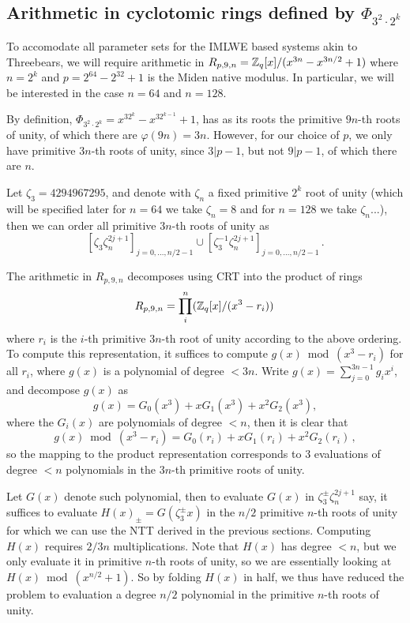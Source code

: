 \subsection{Arithmetic in cyclotomic rings defined by $\Phi_{3^2 \cdot 2^k}$}

To accomodate all parameter sets for the IMLWE based systems akin to Threebears, we will require arithmetic 
in $R_{p, 9, n} = \mathbb{Z}_q[x] / (x^{3n} - x^{3n/2} + 1)$ where $n = 2^k$ and $p = 2^64 - 2^32 + 1$ is the Miden native modulus.  
In particular, we will be interested  in the case $n = 64$ and $n = 128$.

By definition, $\Phi_{3^2 \cdot 2^k} = x^{3 2^k}  - x^{3 2^{k-1}} + 1$, has as its roots the primitive $9 n$-th roots of unity, 
of which there are $\varphi(9 n) = 3 n$.  However, for our choice of $p$, we only have primitive $3 n$-th roots of unity, since $3 | p-1$, 
but not $9 | p-1$, of which there are $n$.

Let $\zeta_3 = 4294967295$, and denote with $\zeta_{n}$ a fixed primitive $2^k$ root of unity (which will be specified later
for $n = 64$ we take $\zeta_n = 8$ and for $n = 128$ we take $\zeta_n ...$), then we can order all primitive $3 n$-th roots of unity as 
\[   [\zeta_3 \zeta_{n}^{2j+1}]_{j = 0, \ldots, n/2-1} \cup [ \zeta_3^{-1} \zeta_{n}^{2j+1}]_{j = 0, \ldots, n/2-1}  \, . \]

The arithmetic in $R_{p, 9, n}$ decomposes using CRT into the product of rings
\[  R_{p, 9, n} = \prod_{i}^{n} (\mathbb{Z}_q[x] / (x^3 - r_i))  \,  \]
where $r_i$ is the $i$-th primitive $3 n$-th root of unity according to the above ordering.
To compute this representation, it suffices to compute $g(x) \bmod (x^3 - r_i)$ for all $r_i$, 
where $g(x)$ is a polynomial of degree $< 3n$.  Write $g(x) = \sum_{j = 0}^{3n-1} g_i x^i$, 
and decompose $g(x)$ as 
\[  g(x) = G_0(x^3) + x G_1(x^3) + x^2 G_2(x^3) , \]
where the $G_i(x)$ are polynomials of degree $<n$, 
then it is clear that 
\[ g(x) \bmod (x^3 - r_i) = G_0(r_i) + x G_1(r_i) + x^2 G_2(r_i) \, ,  \]
so the mapping to the product representation corresponds to $3$ 
evaluations of degree $<n$ polynomials in the $3n$-th primitive roots of unity.

Let $G(x)$ denote such polynomial, then to evaluate $G(x)$ in $\zeta_3^{\pm} \zeta_n^{2j+1}$ say, 
it suffices to evaluate $H(x)_{\pm} = G(\zeta_3^\pm x)$ in the $n/2$ primitive $n$-th roots of unity for which we 
can use the NTT derived in the previous sections.  Computing $H(x)$ requires $2/3n$ multiplications.
Note that $H(x)$ has degree $<n$, but we only evaluate it in primitive $n$-th roots of unity, so we are 
essentially looking at $H(x) \bmod (x^{n/2} + 1)$.  So by folding $H(x)$ in half, we thus have 
reduced the problem to evaluation a degree $n/2$ polynomial in the primitive $n$-th roots of unity.

